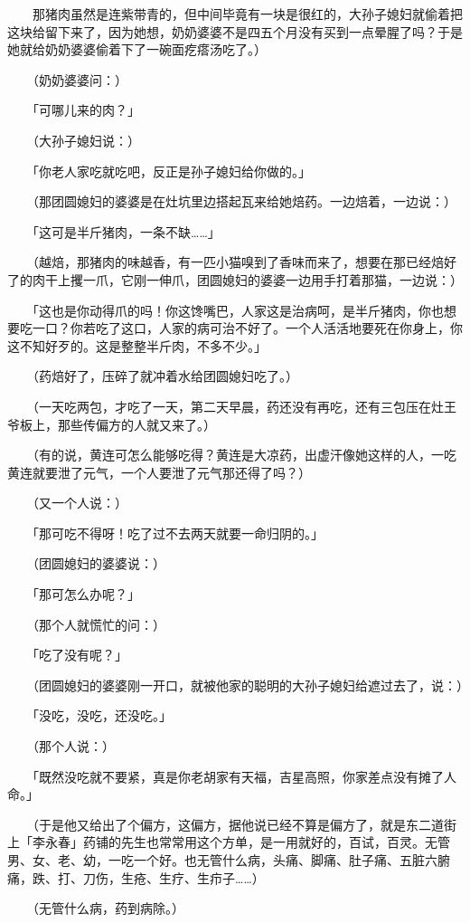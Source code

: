 \documentclass[UTF8]{ctexart}
\begin{document}
　　那猪肉虽然是连紫带青的，但中间毕竟有一块是很红的，大孙子媳妇就偷着把这块给留下来了，因为她想，奶奶婆婆不是四五个月没有买到一点晕腥了吗？于是她就给奶奶婆婆偷着下了一碗面疙瘩汤吃了。）

　　（奶奶婆婆问：）

　　「可哪儿来的肉？」

　　（大孙子媳妇说：）

　　「你老人家吃就吃吧，反正是孙子媳妇给你做的。」

　　（那团圆媳妇的婆婆是在灶坑里边搭起瓦来给她焙药。一边焙着，一边说：）

　　「这可是半斤猪肉，一条不缺……」

　　（越焙，那猪肉的味越香，有一匹小猫嗅到了香味而来了，想要在那已经焙好了的肉干上攫一爪，它刚一伸爪，团圆媳妇的婆婆一边用手打着那猫，一边说：）

　　「这也是你动得爪的吗！你这馋嘴巴，人家这是治病呵，是半斤猪肉，你也想要吃一口？你若吃了这口，人家的病可治不好了。一个人活活地要死在你身上，你这不知好歹的。这是整整半斤肉，不多不少。」

　　（药焙好了，压碎了就冲着水给团圆媳妇吃了。）

　　（一天吃两包，才吃了一天，第二天早晨，药还没有再吃，还有三包压在灶王爷板上，那些传偏方的人就又来了。）

　　（有的说，黄连可怎么能够吃得？黄连是大凉药，出虚汗像她这样的人，一吃黄连就要泄了元气，一个人要泄了元气那还得了吗？）

　　（又一个人说：）

　　「那可吃不得呀！吃了过不去两天就要一命归阴的。」

　　（团圆媳妇的婆婆说：）

　　「那可怎么办呢？」

　　（那个人就慌忙的问：）

　　「吃了没有呢？」

　　（团圆媳妇的婆婆刚一开口，就被他家的聪明的大孙子媳妇给遮过去了，说：）

　　「没吃，没吃，还没吃。」

　　（那个人说：）

　　「既然没吃就不要紧，真是你老胡家有天福，吉星高照，你家差点没有摊了人命。」

　　（于是他又给出了个偏方，这偏方，据他说已经不算是偏方了，就是东二道街上「李永春」药铺的先生也常常用这个方单，是一用就好的，百试，百灵。无管男、女、老、幼，一吃一个好。也无管什么病，头痛、脚痛、肚子痛、五脏六腑痛，跌、打、刀伤，生疮、生疗、生疖子……）

　　（无管什么病，药到病除。）
\end{document}
